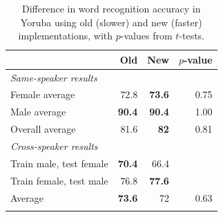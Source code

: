 \documentclass[11pt]{article}
\begin{document}
\begin{table}
\begin{center}
\begin{tabularx}{\columnwidth}{X r r r}
\hline
 & Old & New & $p$-value\\
\hline
\addlinespace
\textit{Same-speaker results} & & & \\
\addlinespace
Female  average & 72.8 & \textbf{73.6} & 0.75 \\
Male  average & \textbf{90.4} & \textbf{90.4} & 1.00\\
Overall average & 81.6 & \textbf{82} & 0.81 \\
\addlinespace
\hline
\addlinespace
 \textit{Cross-speaker results} &  &  & \\
 \addlinespace
 Train male, test female & \textbf{70.4} & 66.4 &\\
Train female, test male & 76.8 & \textbf{77.6} &\\
 Average & \textbf{73.6} & 72 & 0.63\\
 \addlinespace
\hline
\end{tabularx}
\end{center}
\caption{Difference in word recognition accuracy in Yoruba 
using old (slower) and new (faster) implementations, with $p$-values from 
$t$-tests. \label{tab:accuracy}}
\end{table}
\end{document}
